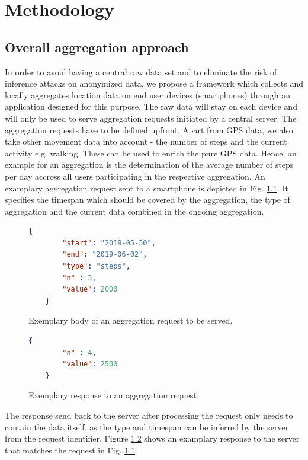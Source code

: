 \chapter{Methodology}\label{chapter:method}
\section{Overall aggregation approach}
In order to avoid having a central raw data set and to eliminate the risk of inference attacks on anonymized data, we propose a framework which collects and locally aggregates location data on end user devices (smartphones) through an application designed for this purpose. The raw data will stay on each device and will only be used to serve aggregation requests initiated by a central server. The aggregation requests have to be defined upfront. Apart from GPS data, we also take other movement data into account - the number of steps and the current activity e.g. walking. These can be used to enrich the pure GPS data. Hence, an example for an aggregation is the determination of the average number of steps per day accross all users participating in the respective aggregation. An examplary aggregation request sent to a smartphone is depicted in Fig. \ref{incoming-aggregation-request}. It specifies the timespan which should be covered by the aggregation, the type of aggregation and the current data combined in the ongoing aggregation.

\begin{figure}[h!]
	\begin{lstlisting}[language=json,firstnumber=1]
	{
		"start": "2019-05-30",
		"end": "2019-06-02",
		"type": "steps",
		"n" : 3,
		"value": 2000
	}
	\end{lstlisting}
	\caption{Exemplary body of an aggregation request to be served.}
	\label{incoming-aggregation-request}
\end{figure}

\begin{figure}[h!]
	\begin{lstlisting}[language=json,firstnumber=1]
	{
		"n" : 4,
		"value": 2500
	}
	\end{lstlisting}
	\caption{Exemplary response to an aggregation request.}
	\label{outgoing-aggregation-response}
\end{figure}

The response send back to the server after processing the request only needs to contain the data itself, as the type and timespan can be inferred by the server from the request identifier. Figure \ref{outgoing-aggregation-response} shows an examplary response to the server that matches the request in Fig. \ref{incoming-aggregation-request}.


